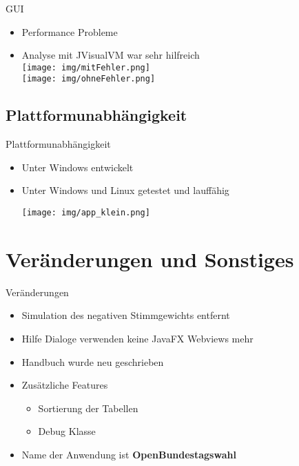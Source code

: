 \documentclass[18pt]{beamer}
\begin{document}
\begin{frame}{GUI}
\begin{itemize}
	\item Performance Probleme
	\item Analyse mit JVisualVM war sehr hilfreich\\
	\texttt{[image: img/mitFehler.png]}\\
	\texttt{[image: img/ohneFehler.png]}
\end{itemize}
\end{frame}

\subsection{Plattformunabhängigkeit}
\begin{frame}{Plattformunabhängigkeit}
\begin{itemize}
	\item Unter Windows entwickelt
	\item Unter Windows und Linux getestet und lauffähig\\
	\begin{center}
		\texttt{[image: img/app\_klein.png]}
	\end{center}
\end{itemize}
\end{frame}

\section{Veränderungen und Sonstiges}
\begin{frame}{Veränderungen}
\begin{itemize}
	\item Simulation des negativen Stimmgewichts entfernt
	\item Hilfe Dialoge verwenden keine JavaFX Webviews mehr
	\item Handbuch wurde neu geschrieben
	\item Zusätzliche Features
	\begin{itemize}
		\item Sortierung der Tabellen
		\item Debug Klasse
	\end{itemize}
	\item Name der Anwendung ist \textbf{OpenBundestagswahl}
\end{itemize}
\end{frame}
\end{document}
